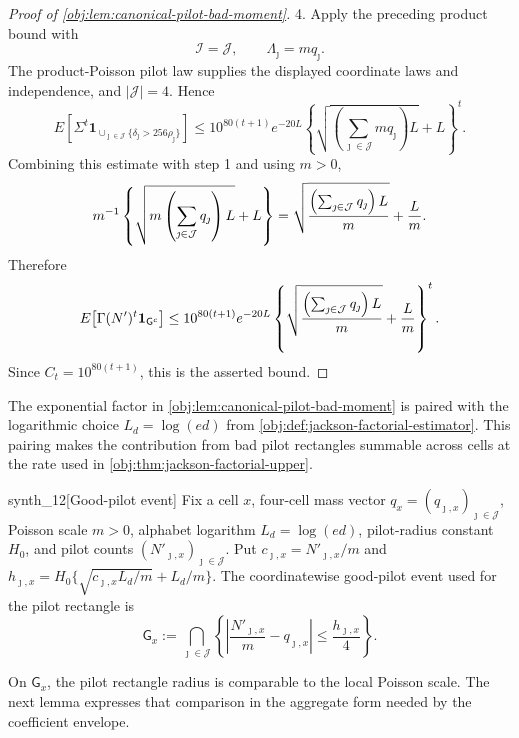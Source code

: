 \documentclass[11pt]{article}
\begin{document}
\begin{proof}[Proof of \cref{obj:lem:canonical-pilot-bad-moment}]
4.  Apply the preceding product bound with
\[
\mathcal I=\mathcal J,
\qquad
\Lambda_\jmath=mq_\jmath .
\]
The product-Poisson pilot law supplies the displayed coordinate laws and
independence, and \(|\mathcal J|=4\).  Hence
\[
E\!\left[
\Sigma^t
\mathbf 1_{\cup_{\jmath\in\mathcal J}\{\delta_\jmath>256\rho_\jmath\}}
\right]
\le
10^{80(t+1)}e^{-20L}
\left\{
\sqrt{\left(\sum_{\jmath\in\mathcal J}mq_\jmath\right)L}+L
\right\}^{t}.
\]
Combining this estimate with step 1 and using \(m>0\),
\[
m^{-1}
\left\{
\sqrt{m\left(\sum_{\jmath\in\mathcal J}q_\jmath\right)L}+L
\right\}
=
\sqrt{{\left(\sum_{\jmath\in\mathcal J}q_\jmath\right)L\over m}}
+
{L\over m}.
\]
Therefore
\[
E\!\left[\Gamma(N')^t\mathbf 1_{\mathsf G^c}\right]
\le
10^{80(t+1)}e^{-20L}
\left\{
\sqrt{{\left(\sum_{\jmath\in\mathcal J}q_\jmath\right)L\over m}}
+
{L\over m}
\right\}^{t}.
\]
Since \(C_t=10^{80(t+1)}\), this is the asserted bound.
\end{proof}

The exponential factor in \cref{obj:lem:canonical-pilot-bad-moment} is paired with the logarithmic choice \(L_d=\log(ed)\) from \cref{obj:def:jackson-factorial-estimator}. This pairing makes the contribution from bad pilot rectangles summable across cells at the rate used in \cref{obj:thm:jackson-factorial-upper}.

\begin{definitionv}{synth_12}[Good-pilot event]
Fix a cell \(x\), four-cell mass vector \(q_x=(q_{\jmath,x})_{\jmath\in\mathcal J}\), Poisson scale \(m>0\), alphabet logarithm \(L_d=\log(ed)\), pilot-radius constant \(H_0\), and pilot counts \((N'_{\jmath,x})_{\jmath\in\mathcal J}\). Put \(c_{\jmath,x}=N'_{\jmath,x}/m\) and \(h_{\jmath,x}=H_0\{\sqrt{c_{\jmath,x}L_d/m}+L_d/m\}\). The coordinatewise good-pilot event used for the pilot rectangle is \[\mathsf G_x:=\bigcap_{\jmath\in\mathcal J}\left\{\left|\frac{N'_{\jmath,x}}{m}-q_{\jmath,x}\right|\le \frac{h_{\jmath,x}}{4}\right\}.\]
\end{definitionv}

On \(\mathsf G_x\), the pilot rectangle radius is comparable to the local Poisson scale. The next lemma expresses that comparison in the aggregate form needed by the coefficient envelope.
\end{document}
